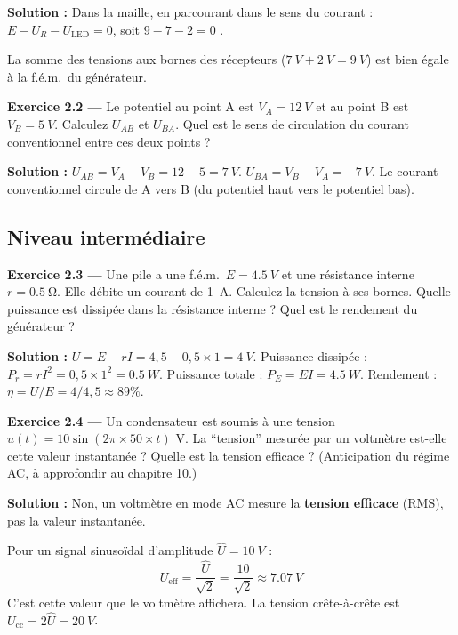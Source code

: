 \documentclass[12pt,a4paper,twoside]{book}
\begin{document}
\begin{pratique}
\textbf{Solution :} Dans la maille, en parcourant dans le sens du courant : $E - U_R - U_{\text{LED}} = 0$, soit $9 - 7 - 2 = 0$ \checkmark.

La somme des tensions aux bornes des récepteurs ($\SI{7}{V} + \SI{2}{V} = \SI{9}{V}$) est bien égale à la f.é.m.\ du générateur.
\end{pratique}

\textbf{Exercice 2.2 —} Le potentiel au point A est $V_A = \SI{12}{V}$ et au point B est $V_B = \SI{5}{V}$. Calculez $U_{AB}$ et $U_{BA}$. Quel est le sens de circulation du courant conventionnel entre ces deux points ?

\begin{pratique}
\textbf{Solution :} $U_{AB} = V_A - V_B = 12 - 5 = \SI{7}{V}$. $U_{BA} = V_B - V_A = \SI{-7}{V}$.
Le courant conventionnel circule de A vers B (du potentiel haut vers le potentiel bas).
\end{pratique}

\subsection*{Niveau intermédiaire}

\textbf{Exercice 2.3 —} Une pile a une f.é.m.\ $E = \SI{4.5}{V}$ et une résistance interne $r = \SI{0.5}{\ohm}$. Elle débite un courant de \SI{1}{A}. Calculez la tension à ses bornes. Quelle puissance est dissipée dans la résistance interne ? Quel est le rendement du générateur ?

\begin{pratique}
\textbf{Solution :} $U = E - rI = 4{,}5 - 0{,}5 \times 1 = \SI{4}{V}$.
Puissance dissipée : $P_r = rI^2 = 0{,}5 \times 1^2 = \SI{0.5}{W}$.
Puissance totale : $P_E = EI = \SI{4.5}{W}$. Rendement : $\eta = U/E = 4/4{,}5 \approx 89\%$.
\end{pratique}

\textbf{Exercice 2.4 —} Un condensateur est soumis à une tension $u(t) = 10\sin(2\pi \times 50 \times t)$ V. La ``tension'' mesurée par un voltmètre est-elle cette valeur instantanée ? Quelle est la tension efficace ? (Anticipation du régime AC, à approfondir au chapitre 10.)

\begin{pratique}
\textbf{Solution :} Non, un voltmètre en mode AC mesure la \textbf{tension efficace} (RMS), pas la valeur instantanée.

Pour un signal sinusoïdal d'amplitude $\hat{U} = \SI{10}{V}$ :
\[
U_{\text{eff}} = \frac{\hat{U}}{\sqrt{2}} = \frac{10}{\sqrt{2}} \approx \SI{7.07}{V}
\]
C'est cette valeur que le voltmètre affichera. La tension crête-à-crête est $U_{\text{cc}} = 2\hat{U} = \SI{20}{V}$.
\end{pratique}
\end{document}
